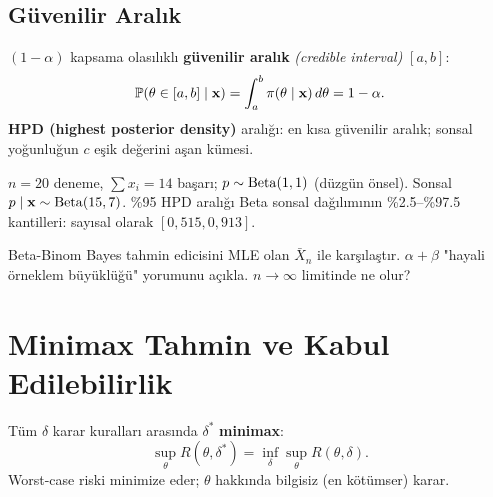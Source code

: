 \subsection{Güvenilir Aralık}

\begin{tanim}\label{def:guvenilir_aralik}
$(1-\alpha)$ kapsama olasılıklı \textbf{güvenilir aralık} \emph{(credible interval)} $[a,b]$:
\[
  \mathbb{P}(\theta\in[a,b]\mid\mathbf{x}) = \int_a^b \pi(\theta\mid\mathbf{x})\,d\theta = 1-\alpha.
\]
\textbf{HPD (highest posterior density)} aralığı: en kısa güvenilir aralık; sonsal yoğunluğun $c$ eşik değerini aşan kümesi.
\end{tanim}

\begin{ornek}\label{ex:beta_credible}
$n=20$ deneme, $\sum x_i=14$ başarı; $p\sim\operatorname{Beta}(1,1)$ (düzgün önsel). Sonsal $p\mid\mathbf{x}\sim\operatorname{Beta}(15,7)$. \%95 HPD aralığı Beta sonsal dağılımının \%2.5--\%97.5 kantilleri: sayısal olarak $[0{,}515, 0{,}913]$.
\end{ornek}

\begin{kendinleifade}
Beta-Binom Bayes tahmin edicisini MLE olan $\bar{X}_n$ ile karşılaştır. $\alpha+\beta$ "hayali örneklem büyüklüğü" yorumunu açıkla. $n\to\infty$ limitinde ne olur?
\end{kendinleifade}

\section{Minimax Tahmin ve Kabul Edilebilirlik}
\label{sec:minimax}

\begin{tanim}\label{def:minimax}
Tüm $\delta$ karar kuralları arasında $\delta^*$ \textbf{minimax}:
\[
  \sup_\theta R(\theta,\delta^*) = \inf_\delta\sup_\theta R(\theta,\delta).
\]
Worst-case riski minimize eder; $\theta$ hakkında bilgisiz (en kötümser) karar.
\end{tanim}

